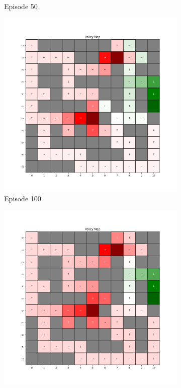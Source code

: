 \documentclass{assignment}
\begin{document}
\begin{figure}[H]
\begin{subfigure}{0.3\textwidth}
    \caption{Episode 50}
    \end{subfigure}\hfill
    \begin{subfigure}{0.3\textwidth}
        \includegraphics[width=\textwidth]{figures/policy_td/epsilon_sweep/policy_alpha_0.1_gamma_0.95_epsilon_0.8_iteration_100.png}
    \caption{Episode 100}
    \end{subfigure}
    \begin{subfigure}{0.3\textwidth}
        \includegraphics[width=\textwidth]{figures/policy_td/epsilon_sweep/policy_alpha_0.1_gamma_0.95_epsilon_0.8_iteration_1000.png}

\end{subfigure}
\end{figure}
\end{document}

